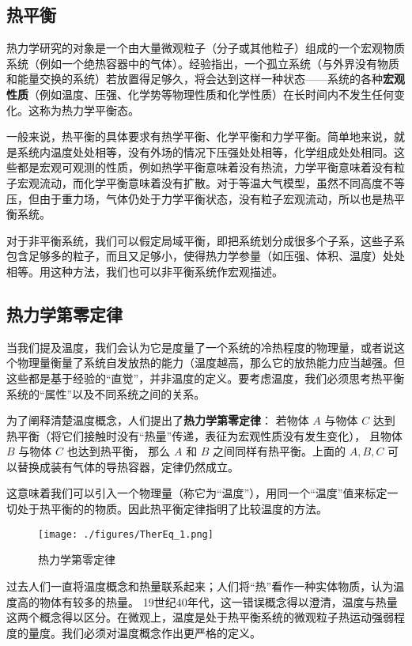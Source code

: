 
\begin{issues}
\issueDraft
\end{issues}

\subsection{热平衡}
热力学研究的对象是一个由大量微观粒子（分子或其他粒子）组成的一个宏观物质系统（例如一个绝热容器中的气体）。经验指出，一个孤立系统（与外界没有物质和能量交换的系统）若放置得足够久，将会达到这样一种状态——系统的各种\textbf{宏观性质}（例如温度、压强、化学势等物理性质和化学性质）在长时间内不发生任何变化。这称为热力学平衡态。

一般来说，热平衡的具体要求有热学平衡、化学平衡和力学平衡。简单地来说，就是系统内温度处处相等，没有外场的情况下压强处处相等，化学组成处处相同。这些都是宏观可观测的性质，例如热学平衡意味着没有热流，力学平衡意味着没有粒子宏观流动，而化学平衡意味着没有扩散。对于等温大气模型，虽然不同高度不等压，但由于重力场，气体仍处于力学平衡状态，没有粒子宏观流动，所以也是热平衡系统。

对于非平衡系统，我们可以假定局域平衡，即把系统划分成很多个子系，这些子系包含足够多的粒子，而且又足够小，使得热力学参量（如压强、体积、温度）处处相等。用这种方法，我们也可以非平衡系统作宏观描述。

\subsection{热力学第零定律}
当我们提及温度，我们会认为它是度量了一个系统的冷热程度的物理量，或者说这个物理量衡量了系统自发放热的能力（温度越高，那么它的放热能力应当越强。但这些都是基于经验的“直觉”，并非温度的定义。要考虑温度，我们必须思考热平衡系统的“属性”以及不同系统之间的关系。

为了阐释清楚温度概念，人们提出了\textbf{热力学第零定律}：
若物体 $A$ 与物体 $C$ 达到热平衡（将它们接触时没有“热量”传递，表征为宏观性质没有发生变化）， 且物体 $B$ 与物体 $C$ 也达到热平衡， 那么 $A$ 和 $B$ 之间同样有热平衡。上面的 $A,B,C$ 可以替换成装有气体的导热容器，定律仍然成立。

这意味着我们可以引入一个物理量（称它为“温度”），用同一个“温度”值来标定一切处于热平衡的的物质。因此热平衡定律指明了比较温度的方法。
\begin{figure}[ht]
\centering
\texttt{[image: ./figures/TherEq\_1.png]}
\caption{热力学第零定律} \label{TherEq_fig1}
\end{figure}

过去人们一直将温度概念和热量联系起来；人们将“热”看作一种实体物质，认为温度高的物体有较多的热量。 19世纪40年代，这一错误概念得以澄清，温度与热量这两个概念得以区分。在微观上，温度是处于热平衡系统的微观粒子热运动强弱程度的量度。我们必须对温度概念作出更严格的定义。

